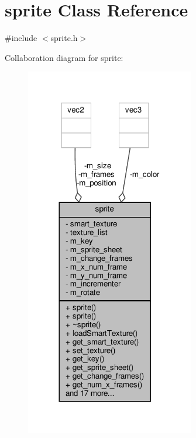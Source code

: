 \hypertarget{classsprite}{}\section{sprite Class Reference}
\label{classsprite}


{\ttfamily \#include $<$sprite.\+h$>$}



Collaboration diagram for sprite\+:
\nopagebreak
\begin{figure}[H]
\begin{center}
\leavevmode
\includegraphics[width=209pt]{classsprite__coll__graph}
\end{center}
\end{figure}
